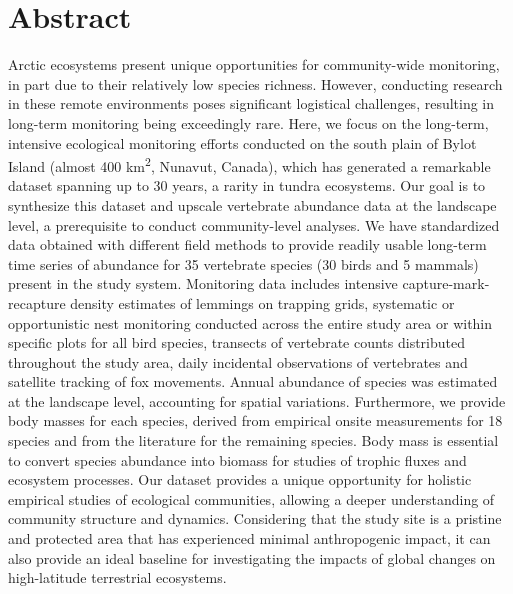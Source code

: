\documentclass[a4paper,twoside,10pt]{article}
\begin{document}
\section*{Abstract}
Arctic ecosystems present unique opportunities for community-wide monitoring, in part due to their relatively low species richness. However, conducting research in these remote environments poses significant logistical challenges, resulting in long-term monitoring being exceedingly rare. Here, we focus on the long-term, intensive ecological monitoring efforts conducted on the south plain of Bylot Island (almost 400 km\textsuperscript{2}, Nunavut, Canada), which has generated a remarkable dataset spanning up to 30 years, a rarity in tundra ecosystems. Our goal is to synthesize this dataset and upscale vertebrate abundance data at the landscape level, a prerequisite to conduct community-level analyses. We have standardized data obtained with different field methods to provide readily usable long-term time series of abundance for 35 vertebrate species (30 birds and 5 mammals) present in the study system. Monitoring data includes intensive capture-mark-recapture density estimates of lemmings on trapping grids, systematic or opportunistic nest monitoring conducted across the entire study area or within specific plots for all bird species, transects of vertebrate counts distributed throughout the study area, daily incidental observations of vertebrates and satellite tracking of fox movements. Annual abundance of species was estimated at the landscape level, accounting for spatial variations. Furthermore, we provide body masses for each species, derived from empirical onsite measurements for 18 species and from the literature for the remaining species. Body mass is essential to convert species abundance into biomass for studies of trophic fluxes and ecosystem processes. Our dataset provides a unique opportunity for holistic empirical studies of ecological communities, allowing a deeper understanding of community structure and dynamics. Considering that the study site is a pristine and protected area that has experienced minimal anthropogenic impact, it can also provide an ideal baseline for investigating the impacts of global changes on high-latitude terrestrial ecosystems. 
\end{document}
